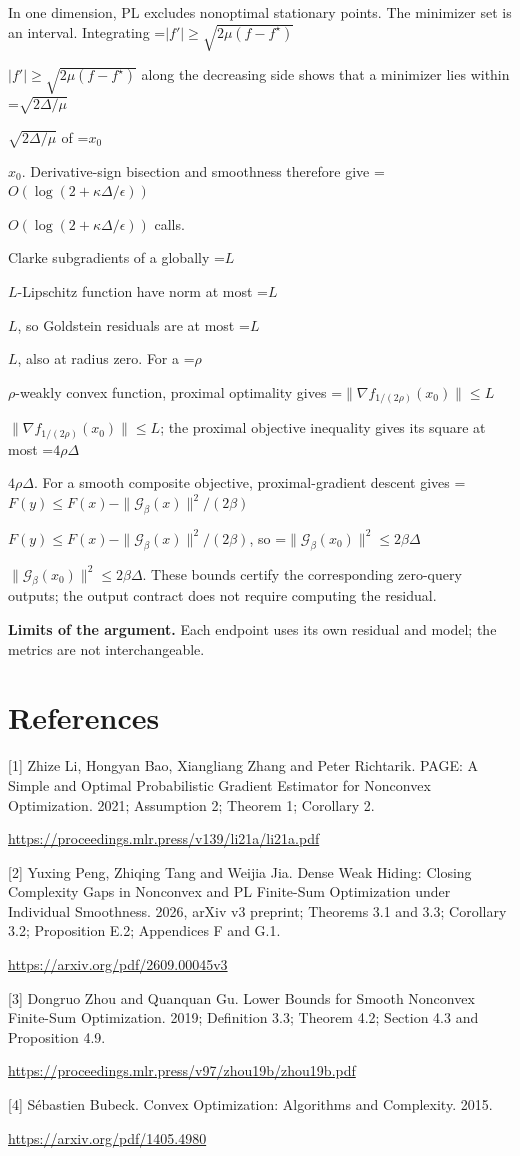 \documentclass[10pt,a4paper]{article}
\newcommand{\AtlasMath}[1]{\par\begingroup\centering\setbox0=\hbox{$\displaystyle #1$}\ifdim\wd0>1.4\linewidth\typeout{ATLAS WIDE FORMULA: \the\wd0}\fi\ifdim\wd0>\linewidth\resizebox{\linewidth}{!}{\box0}\else\box0\fi\par\endgroup}
\newcommand{\AtlasInlineMath}[1]{\begingroup\setbox0=\hbox{$#1$}\ifdim\wd0>.4\linewidth\endgroup\AtlasMath{#1}\else\endgroup$#1$\fi}
\begin{document}
In one dimension, PL excludes nonoptimal stationary points. The minimizer set is an interval. Integrating
\AtlasInlineMath{|f'|\ge\sqrt{2\mu(f-f^\star)}}
along the decreasing side shows that a minimizer lies within \AtlasInlineMath{\sqrt{2\Delta/\mu}} of \AtlasInlineMath{x_0}. Derivative-sign bisection and smoothness therefore give \AtlasInlineMath{O(\log(2+\kappa\Delta/\epsilon))} calls.

Clarke subgradients of a globally \AtlasInlineMath{L}-Lipschitz function have norm at most \AtlasInlineMath{L}, so Goldstein residuals are at most \AtlasInlineMath{L}, also at radius zero. For a \AtlasInlineMath{\rho}-weakly convex function, proximal optimality gives
\AtlasInlineMath{\|\nabla f_{1/(2\rho)}(x_0)\|\le L}; the proximal objective inequality gives its square at most \AtlasInlineMath{4\rho\Delta}.
For a smooth composite objective, proximal-gradient descent gives
\AtlasInlineMath{F(y)\le F(x)-\|\mathcal G_\beta(x)\|^2/(2\beta)},
so \AtlasInlineMath{\|\mathcal G_\beta(x_0)\|^2\le2\beta\Delta}.
These bounds certify the corresponding zero-query outputs; the output contract does not require computing the residual.

\textbf{Limits of the argument.} Each endpoint uses its own residual and model; the metrics are not interchangeable.

\section{References}
[1] Zhize Li, Hongyan Bao, Xiangliang Zhang and Peter Richtarik. PAGE: A Simple and Optimal Probabilistic Gradient Estimator for Nonconvex Optimization. 2021; Assumption 2; Theorem 1; Corollary 2.

\url{https://proceedings.mlr.press/v139/li21a/li21a.pdf}

[2] Yuxing Peng, Zhiqing Tang and Weijia Jia. Dense Weak Hiding: Closing Complexity Gaps in Nonconvex and PL Finite-Sum Optimization under Individual Smoothness. 2026, arXiv v3 preprint; Theorems 3.1 and 3.3; Corollary 3.2; Proposition E.2; Appendices F and G.1.

\url{https://arxiv.org/pdf/2609.00045v3}

[3] Dongruo Zhou and Quanquan Gu. Lower Bounds for Smooth Nonconvex Finite-Sum Optimization. 2019; Definition 3.3; Theorem 4.2; Section 4.3 and Proposition 4.9.

\url{https://proceedings.mlr.press/v97/zhou19b/zhou19b.pdf}

[4] Sébastien Bubeck. Convex Optimization: Algorithms and Complexity. 2015.

\url{https://arxiv.org/pdf/1405.4980}
\end{document}
